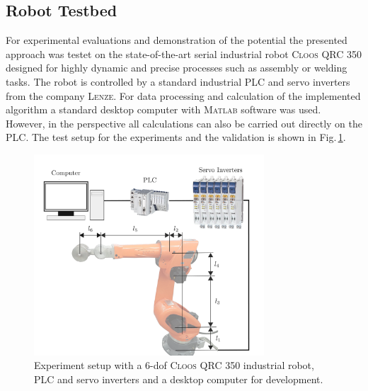 \subsection{Robot Testbed}
\label{subsec:RobotTestbed}
For experimental evaluations and demonstration of the potential the presented approach was testet on the state-of-the-art serial industrial  robot \textsc{Cloos QRC 350} designed for highly dynamic and precise processes such as assembly or welding tasks. 
The robot is controlled by a standard industrial PLC and servo inverters from the company \textsc{Lenze}. 
For data processing and calculation of the implemented algorithm a standard desktop computer with \textsc{Matlab} software was used. 
However, in the perspective all calculations can also be carried out directly on the PLC. 
The test setup for the experiments and the validation is shown in Fig.\,\ref{fig:testbench}. 

\begin{figure}[!ht]             %
    \centering                  %
    \def\svgwidth{\textwidth/2}    
    \includegraphics[width=8.6cm]{Chapters/Experiments/Robot_Testbed/Cloos_cover} 
               \caption{Experiment setup with a 6-dof \textsc{Cloos QRC 350} industrial robot, PLC and servo inverters and a desktop computer for development.}
   \label{fig:testbench}
\end{figure}




